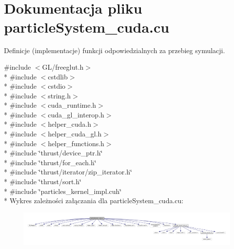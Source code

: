 \hypertarget{particle_system__cuda_8cu}{\section{Dokumentacja pliku particle\-System\-\_\-cuda.\-cu}
\label{particle_system__cuda_8cu}
}


Definicje (implementacje) funkcji odpowiedzialnych za przebieg symulacji.  


{\ttfamily \#include $<$G\-L/freeglut.\-h$>$}\\*
{\ttfamily \#include $<$cstdlib$>$}\\*
{\ttfamily \#include $<$cstdio$>$}\\*
{\ttfamily \#include $<$string.\-h$>$}\\*
{\ttfamily \#include $<$cuda\-\_\-runtime.\-h$>$}\\*
{\ttfamily \#include $<$cuda\-\_\-gl\-\_\-interop.\-h$>$}\\*
{\ttfamily \#include $<$helper\-\_\-cuda.\-h$>$}\\*
{\ttfamily \#include $<$helper\-\_\-cuda\-\_\-gl.\-h$>$}\\*
{\ttfamily \#include $<$helper\-\_\-functions.\-h$>$}\\*
{\ttfamily \#include \char`\"{}thrust/device\-\_\-ptr.\-h\char`\"{}}\\*
{\ttfamily \#include \char`\"{}thrust/for\-\_\-each.\-h\char`\"{}}\\*
{\ttfamily \#include \char`\"{}thrust/iterator/zip\-\_\-iterator.\-h\char`\"{}}\\*
{\ttfamily \#include \char`\"{}thrust/sort.\-h\char`\"{}}\\*
{\ttfamily \#include \char`\"{}particles\-\_\-kernel\-\_\-impl.\-cuh\char`\"{}}\\*
Wykres zależności załączania dla particle\-System\-\_\-cuda.\-cu\-:\nopagebreak
\begin{figure}[H]
\begin{center}
\leavevmode
\includegraphics[width=350pt]{particle_system__cuda_8cu__incl}
\end{center}
\end{figure}
